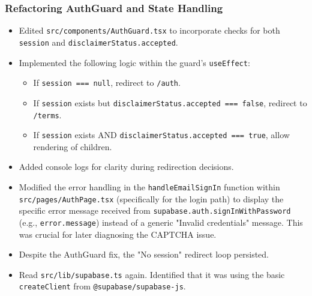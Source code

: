 \documentclass[11pt]{article} %
\begin{document}
\subsubsection{Refactoring AuthGuard and State Handling}
\begin{description}[style=unboxed,leftmargin=0pt]
    \item[AI Assistance (AuthGuard Fix):]
        \begin{itemize}
            \item Edited \texttt{src/components/AuthGuard.tsx} to incorporate checks for both \texttt{session} and \texttt{disclaimerStatus.accepted}.
            \item Implemented the following logic within the guard's \texttt{useEffect}:
                \begin{itemize}
                    \item If \texttt{session === null}, redirect to \texttt{/auth}.
                    \item If \texttt{session} exists but \texttt{disclaimerStatus.accepted === false}, redirect to \texttt{/terms}.
                    \item If \texttt{session} exists AND \texttt{disclaimerStatus.accepted === true}, allow rendering of children.
                \end{itemize}
             \item Added console logs for clarity during redirection decisions.
        \end{itemize}
    \item[AI Assistance (Login Error Reporting):]
         \begin{itemize}
             \item Modified the error handling in the \texttt{handleEmailSignIn} function within \texttt{src/pages/AuthPage.tsx} (specifically for the login path) to display the specific error message received from \texttt{supabase.auth.signInWithPassword} (e.g., \texttt{error.message}) instead of a generic "Invalid credentials" message. This was crucial for later diagnosing the CAPTCHA issue.
         \end{itemize}
    \item[AI Assistance (Session State Refactoring - \texttt{createBrowserClient}):]
         \begin{itemize}
             \item Despite the AuthGuard fix, the "No session" redirect loop persisted.
             \item Read \texttt{src/lib/supabase.ts} again. Identified that it was using the basic \texttt{createClient} from \texttt{@supabase/supabase-js}.

\end{itemize}
\end{description}
\end{document}
